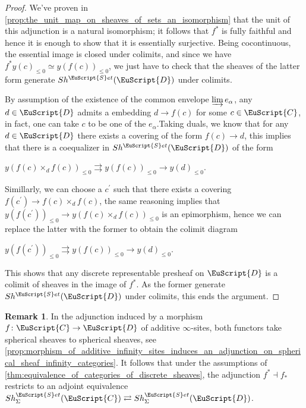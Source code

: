 \documentclass[oneside,a4paper]{amsart}
\newcommand{\euscr}[1]{\EuScript{#1}} %
\newcommand{\ccat}{\euscr{C}} %
\newcommand{\dcat}{\euscr{D}} %
\newcommand{\sets}{\euscr{S}et} %
\theoremstyle{plain}
\theoremstyle{definition}
\newtheorem{rem}[thm]{Remark}
\theoremstyle{remark}
\begin{document}
\begin{proof}
We've proven in \cref{prop:the_unit_map_on_sheaves_of_sets_an_isomorphism} that the unit of this adjunction is a natural isomorphism; it follows that $f^{*}$ is fully faithful and hence it is enough to show that it is essentially surjective. Being cocontinuous, the essential image is closed under colimits, and since we have $f^{*} y(c)_{\leq 0} \simeq y(f(c))_{\leq 0}$, we just have to check that the sheaves of the latter form generate $Sh^{\sets}(\dcat)$ under colimits. 

By assumption of the existence of the common envelope $\varinjlim e_{\alpha}$, any $d \in \dcat$ admits a embedding $d \rightarrow f(c)$ for some $c \in \ccat$, in fact, one can take $c$ to be one of the $e_{\alpha}$.Taking duals, we know that for any $d \in \dcat$ there exists a covering of the form $f(c) \rightarrow d$, this implies that there is a coequalizer in $Sh^{\sets}(\dcat)$ of the form 

\begin{center}
$y(f(c) \times _{d} f(c))_{\leq 0} \rightrightarrows y(f(c))_{\leq 0} \rightarrow y(d)_{\leq 0}$.
\end{center}
Simillarly, we can choose a $c^\prime$ such that there exists a covering $f(c^{\prime}) \rightarrow f(c) \times _{d} f(c)$, the same reasoning implies that $y(f(c^{\prime}))_{\leq 0} \rightarrow y(f(c) \times _{d} f(c))_{\leq 0}$ is an epimorphism, hence we can replace the latter with the former to obtain the colimit diagram 

\begin{center}
$y(f(c^{\prime}))_{\leq 0} \rightrightarrows y(f(c))_{\leq 0} \rightarrow y(d)_{\leq 0}$.
\end{center}
This shows that any discrete representable presheaf on $\dcat$ is a colimit of sheaves in the image of $f^{*}$. As the former generate $Sh^{\sets}(\dcat)$ under colimits, this ends the argument. 
\end{proof}

\begin{rem}
\label{rem:induced_adjoint_equivalence_on_discrete_spherical_sheaves}
In the adjunction induced by a morphism $f \colon \ccat \rightarrow \dcat$ of additive $\infty$-sites, both functors take spherical sheaves to spherical sheaves, see \cref{prop:morphism_of_additive_infinity_sites_induces_an_adjunction_on_spherical_sheaf_infinity_categories}. It follows that under the assumptions of \cref{thm:equivalence_of_categories_of_discrete_sheaves}, the adjunction $f^{*} \dashv f_{*}$ restricts to an adjoint equivalence $Sh_{\Sigma}^{\sets}(\ccat) \rightleftarrows Sh_{\Sigma}^{\sets}(\dcat)$.
\end{rem}
\end{document}
